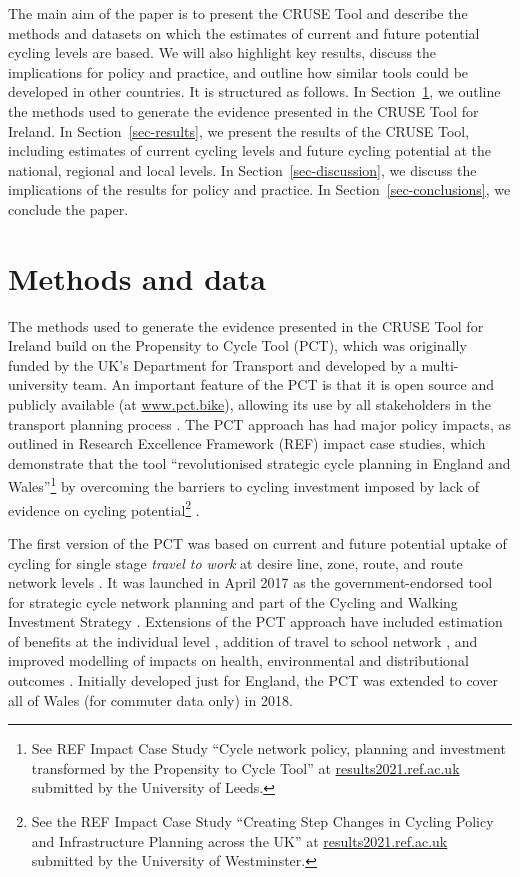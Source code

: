 \documentclass[
  super,
  preprint,
  3p]{elsarticle}
\begin{document}
The main aim of the paper is to present the CRUSE Tool and describe the
methods and datasets on which the estimates of current and future
potential cycling levels are based. We will also highlight key results,
discuss the implications for policy and practice, and outline how
similar tools could be developed in other countries. It is structured as
follows. In Section~\ref{sec-methods}, we outline the methods used to
generate the evidence presented in the CRUSE Tool for Ireland. In
Section~\ref{sec-results}, we present the results of the CRUSE Tool,
including estimates of current cycling levels and future cycling
potential at the national, regional and local levels. In
Section~\ref{sec-discussion}, we discuss the implications of the results
for policy and practice. In Section~\ref{sec-conclusions}, we conclude
the paper.

\hypertarget{sec-methods}{%
\section{Methods and data}\label{sec-methods}}

The methods used to generate the evidence presented in the CRUSE Tool
for Ireland build on the Propensity to Cycle Tool (PCT), which was
originally funded by the UK's Department for Transport and developed by
a multi-university team. An important feature of the PCT is that it is
open source and publicly available (at
\href{https://www.pct.bike/}{www.pct.bike}), allowing its use by all
stakeholders in the transport planning process \citep{lovelace2017}. The
PCT approach has had major policy impacts, as outlined in Research
Excellence Framework (REF) impact case studies, which demonstrate that
the tool ``revolutionised strategic cycle planning in England and
Wales''\footnote{See REF Impact Case Study ``Cycle network policy,
  planning and investment transformed by the Propensity to Cycle Tool''
  at
  \href{https://results2021.ref.ac.uk/impact/847d1191-7f25-46ba-a399-b481125edc8f}{results2021.ref.ac.uk}
  submitted by the University of Leeds.} by overcoming the barriers to
cycling investment imposed by lack of evidence on cycling
potential\footnote{See the REF Impact Case Study ``Creating Step Changes
  in Cycling Policy and Infrastructure Planning across the UK'' at
  \href{https://results2021.ref.ac.uk/impact/4BBF3436-FD10-4C75-9791-F5E98AB4411B}{results2021.ref.ac.uk}
  submitted by the University of Westminster.} .

The first version of the PCT was based on current and future potential
uptake of cycling for single stage \emph{travel to work} at desire line,
zone, route, and route network levels \citep{lovelace2016}. It was
launched in April 2017 as the government-endorsed tool for strategic
cycle network planning and part of the Cycling and Walking Investment
Strategy \citep{cycling2017}. Extensions of the PCT approach have
included estimation of benefits at the individual level
\citep{woodcock2018}, addition of travel to school network
\citep{goodman2019}, and improved modelling of impacts on health,
environmental and distributional outcomes \citep{woodcock2021}.
Initially developed just for England, the PCT was extended to cover all
of Wales (for commuter data only) in 2018.
\end{document}
